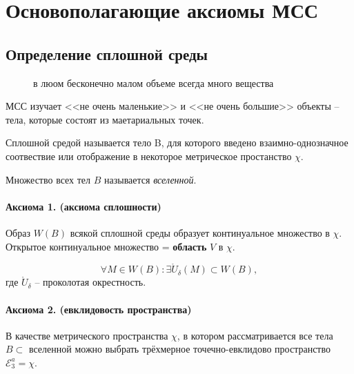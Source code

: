 \section{Основополагающие аксиомы МСС}

\subsection{Определение сплошной среды}

\begin{figure}[h!]
  \centering
  \caption{в люом бесконечно малом объеме всегда много вещества}
\end{figure}



МСС изучает <<не очень маленькие>> и <<не очень большие>> объекты -- тела, которые состоят
из маетариальных точек.

\begin{definition}
  Сплошной средой называется тело B, для которого введено взаимно-однозначное соотвествие
  или отображение в некоторое метрическое простанство $\chi$.
\end{definition}


\begin{definition}
  Множество всех тел $B$ называется \emph{вселенной}.
\end{definition}

\paragraph{Аксиома 1. (аксиома сплошности)} Образ $W(B)$ всякой сплошной среды образует континуальное
множество в $\chi$. Открытое континуальное множество = \textbf{область} $V$ в $\chi$.


\[
  \forall M \in W(B) : \exists \mathring{U}_\delta (M) \subset W(B),
\]
где $\mathring{U}_\delta$ -- проколотая окрестность.

\paragraph{Аксиома 2. (евклидовость пространства)} В качестве метрического пространства $\chi$,
в котором рассматривается все тела $B \subset$ вселенной можно выбрать трёхмерное 
точечно-евклидово пространство $\mathcal{E}^a_3 = \chi$.

